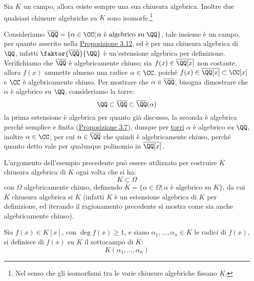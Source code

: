 \documentclass[11pt]{scrartcl}
\begin{document}
\begin{theorem}
    Sia $K$ un campo, allora esiste sempre una sua chiusura algebrica. Inoltre due qualsiasi chiusure algebriche su $K$ sono isomorfe.\footnote{Nel senso che gli isomorfismi tra le varie chiusure algebriche fissano $K$.}
\end{theorem}

\begin{example}
    Consideriamo $\overline\QQ = \{\alpha \in \CC | \, \text{$\alpha$ è algebrico su $\QQ$}\}$, tale insieme è un campo, per quanto asserito nella
    \hyperref[3.12]{Proposizione 3.12}, ed è per una chiusura algebrica di $\QQ$, infatti $\faktor{\overline\QQ}{\QQ}$ è un'estensione algebrica per definizione.
    Verifichiamo che $\overline\QQ$ è algebricamente chiuso; sia $f(x) \in \overline\QQ[x]$ non costante, allora $f(x)$ ammette almeno una radice $\alpha \in \CC$, poiché
    $f(x) \in \overline\QQ[x] \subset \CC[x]$ e $\CC$ è algebricamente chiuso. Per mostrare che $\alpha \in \overline\QQ$, bisogna
    dimostrare che $\alpha$ è algebrico su $\QQ$, consideriamo la torre:
    \[ \QQ \subset \overline \QQ \subset \overline\QQ (\alpha)
        \]
    la prima estensione è algebrica per quanto già discusso, la seconda è algebrica perché semplice e finita (\hyperref[3.7]{Proposizione 3.7}), dunque per \hyperref[torri]{torri} $\alpha$
    è algebrico su $\QQ$, inoltre $\alpha \in \CC$, per cui $\alpha \in \overline\QQ$ che quindi è algebricamente chiuso, perché quanto detto vale per qualunque polinomio in $\overline\QQ[x]$.
\end{example}

\begin{remark}
    L'argomento dell'esempio precedente può essere utilizzato per costruire $\overline K$ chiusura algebrica di $K$ ogni volta che si ha:
    \[ K \subset \Omega
        \]
    con $\Omega$ algebricamente chiuso, definendo $\overline K = \{\alpha \in \Omega |  \, \text{$\alpha$ è algebrico su $K$}\}$, da cui $\overline K$ chiusura algebrica si $K$ (infatti $\overline K$ è un estensione algebrica 
    di $K$ per definizione, ed iterando il ragionamento precedente si mostra come sia anche algebricamente chiuso).
\end{remark}

\begin{definition}
    Sia $f(x) \in K[x]$, con $\deg f(x) \geq 1$, e siano $\alpha_1,\ldots,\alpha_n \in \overline K$ le radici di $f(x)$, si definisce  di $f(x)$ su $K$ il sottocampo di $\overline K$:
    \[ K(\alpha_1,\ldots,\alpha_n)
        \]
\end{definition}
\end{document}
